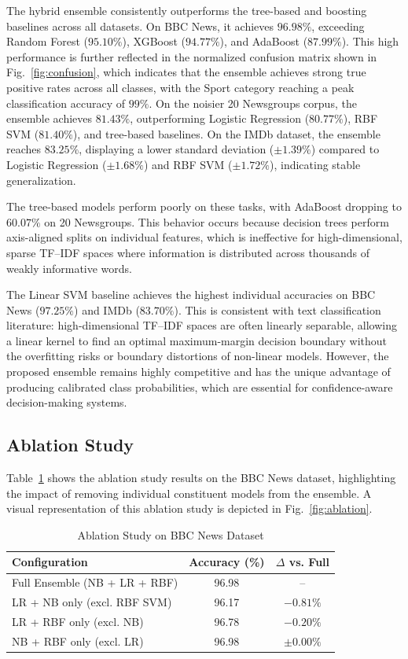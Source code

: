 \documentclass[conference]{IEEEtran}
\begin{document}
The hybrid ensemble consistently outperforms the tree-based and boosting baselines across all datasets. On BBC News, it achieves $96.98\%$, exceeding Random Forest ($95.10\%$), XGBoost ($94.77\%$), and AdaBoost ($87.99\%$). This high performance is further reflected in the normalized confusion matrix shown in Fig.~\ref{fig:confusion}, which indicates that the ensemble achieves strong true positive rates across all classes, with the Sport category reaching a peak classification accuracy of $99\%$. On the noisier 20 Newsgroups corpus, the ensemble achieves $81.43\%$, outperforming Logistic Regression ($80.77\%$), RBF SVM ($81.40\%$), and tree-based baselines. On the IMDb dataset, the ensemble reaches $83.25\%$, displaying a lower standard deviation ($\pm 1.39\%$) compared to Logistic Regression ($\pm 1.68\%$) and RBF SVM ($\pm 1.72\%$), indicating stable generalization.

The tree-based models perform poorly on these tasks, with AdaBoost dropping to $60.07\%$ on 20 Newsgroups. This behavior occurs because decision trees perform axis-aligned splits on individual features, which is ineffective for high-dimensional, sparse TF--IDF spaces where information is distributed across thousands of weakly informative words.

The Linear SVM baseline achieves the highest individual accuracies on BBC News ($97.25\%$) and IMDb ($83.70\%$). This is consistent with text classification literature: high-dimensional TF--IDF spaces are often linearly separable, allowing a linear kernel to find an optimal maximum-margin decision boundary without the overfitting risks or boundary distortions of non-linear models. However, the proposed ensemble remains highly competitive and has the unique advantage of producing calibrated class probabilities, which are essential for confidence-aware decision-making systems.

\subsection{Ablation Study}

Table~\ref{tab:ablation} shows the ablation study results on the BBC News dataset, highlighting the impact of removing individual constituent models from the ensemble. A visual representation of this ablation study is depicted in Fig.~\ref{fig:ablation}.

\begin{table}[htbp]
  \caption{Ablation Study on BBC News Dataset}
  \label{tab:ablation}
  \centering
  \small
  \begin{tabular}{lcc}
    \toprule
    \textbf{Configuration} & \textbf{Accuracy (\%)} & \textbf{$\Delta$ vs. Full} \\
    \midrule
    Full Ensemble (NB + LR + RBF) & 96.98 & -- \\
    LR + NB only (excl. RBF SVM)  & 96.17 & $-0.81\%$ \\
    LR + RBF only (excl. NB)      & 96.78 & $-0.20\%$ \\
    NB + RBF only (excl. LR)      & 96.98 & $\pm 0.00\%$ \\
    \bottomrule
  \end{tabular}
\end{table}
\end{document}
